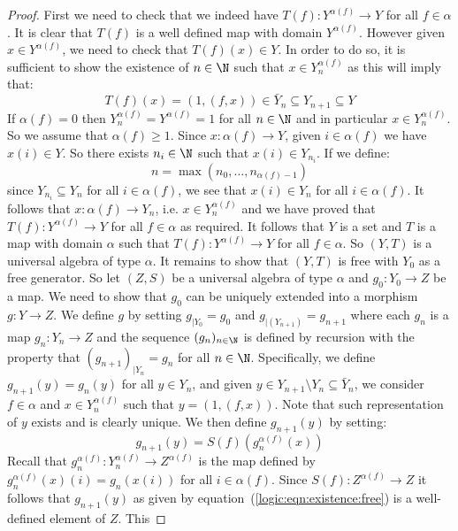 \begin{proof} First we need to check that we indeed have
$T(f):Y^{\alpha(f)}\to Y$ for all $f\in\alpha$. It is clear that $T(f)$ is a well
defined map with domain $Y^{\alpha(f)}$. However given $x\in Y^{\alpha(f)}$, we
need to check that $T(f)(x)\in Y$. In order to do so, it is sufficient to show the
existence of $n\in\N$ such that $x\in Y_{n}^{\alpha(f)}$ as this will imply that:
    \[
    T(f)(x)=(1,(f,x))\in\bar{Y}_{n}\subseteq Y_{n+1}\subseteq Y
    \]
If $\alpha(f)=0$ then $Y_{n}^{\alpha(f)}=Y^{\alpha(f)}=1$ for all $n\in\N$ and in
particular $x\in Y_{n}^{\alpha(f)}$. So we assume that $\alpha(f)\geq 1$. Since
$x:\alpha(f)\to Y$, given $i\in \alpha(f)$ we have $x(i)\in Y$. So there exists
$n_{i}\in\N$ such that $x(i)\in Y_{n_{i}}$. If we define:
    \[
    n = \max(n_{0},\ldots,n_{\alpha(f)-1})
    \]
since $Y_{n_{i}}\subseteq Y_{n}$ for all $i\in\alpha(f)$, we see that $x(i)\in
Y_{n}$ for all $i\in\alpha(f)$. It follows that $x:\alpha(f)\to Y_{n}$, i.e. $x\in
Y_{n}^{\alpha(f)}$ and we have proved that $T(f):Y^{\alpha(f)}\to Y$ for all
$f\in\alpha$ as required. It follows that $Y$ is a set and $T$ is a map with
domain $\alpha$ such that $T(f):Y^{\alpha(f)}\to Y$ for all $f\in\alpha$. So
$(Y,T)$ is a universal algebra of type $\alpha$. It remains to show that $(Y,T)$
is free with $Y_{0}$ as a free generator. So let $(Z,S)$ be a universal algebra of
type $\alpha$ and $g_{0}:Y_{0}\to Z$ be a map. We need to show that $g_{0}$ can be
uniquely extended into a morphism $g:Y\to Z$. We define $g$ by setting $g_{|Y_{0}}
= g_{0}$ and $g_{|(Y_{n+1})}=g_{n+1}$ where each $g_{n}$ is a map $g_{n}:Y_{n}\to
Z$ and the sequence $(g_{n})_{n\in\N}$ is defined by recursion with the property
that $(g_{n+1})_{|Y_{n}}=g_{n}$ for all $n\in\N$. Specifically, we define
$g_{n+1}(y)=g_{n}(y)$ for all $y\in Y_{n}$, and given $y\in Y_{n+1}\setminus Y_{n}
\subseteq \bar{Y}_{n}$, we consider $f\in\alpha$ and $x\in Y_{n}^{\alpha(f)}$ such
that $y=(1,(f,x))$. Note that such representation of $y$ exists and is clearly
unique. We then define $g_{n+1}(y)$ by setting:
    \begin{equation}\label{logic:eqn:existence:free}
    g_{n+1}(y) = S(f)(g_{n}^{\alpha(f)}(x))
    \end{equation}
Recall that $g_{n}^{\alpha(f)}:Y_{n}^{\alpha(f)}\to Z^{\alpha(f)}$ is the map
defined by $g_{n}^{\alpha(f)}(x)(i) = g_{n}(x(i))$ for all $i\in\alpha(f)$. Since
$S(f):Z^{\alpha(f)}\to Z$ it follows that $g_{n+1}(y)$ as given by
equation~(\ref{logic:eqn:existence:free}) is a well-defined element of $Z$. This

\end{proof}
